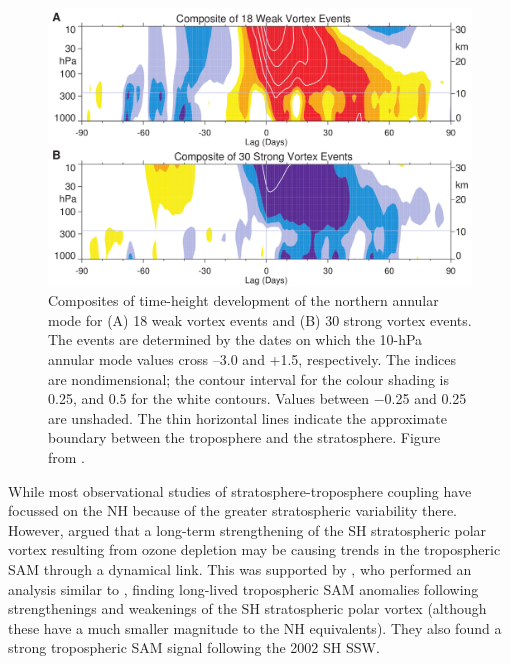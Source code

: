 \begin{figure}
 \centering
 \noindent\includegraphics[width=\textwidth]{figures/chapter-intro/Baldwin_Dunkerton.png}
 \caption[NAM composite from \citet{Baldwin2001a}]{Composites of time-height
   development of the northern annular mode for (A) 18 weak vortex events and
   (B) 30 strong vortex events. The events are determined by the dates on which
   the 10-hPa annular mode values cross –3.0 and +1.5, respectively. The indices
   are nondimensional; the contour interval for the colour shading is 0.25, and
   0.5 for the white contours. Values between −0.25 and 0.25 are unshaded. The
   thin horizontal lines indicate the approximate boundary between the
   troposphere and the stratosphere. Figure from \citet{Baldwin2001a}.}
 \label{fig:baldwin_dunkerton}
\end{figure}

While most observational studies of stratosphere-troposphere coupling have
focussed on the NH because of the greater stratospheric variability
there. However, \citep{ThompsonSolomon2002} argued that a long-term
strengthening of the SH stratospheric polar vortex resulting from ozone
depletion may be causing trends in the tropospheric SAM through a dynamical
link. This was supported by \citet{Thompson2005}, who performed an analysis
similar to \citet{Baldwin2001a}, finding long-lived tropospheric SAM anomalies
following strengthenings and weakenings of the SH stratospheric polar vortex
(although these have a much smaller magnitude to the NH equivalents). They also
found a strong tropospheric SAM signal following the 2002 SH SSW.

